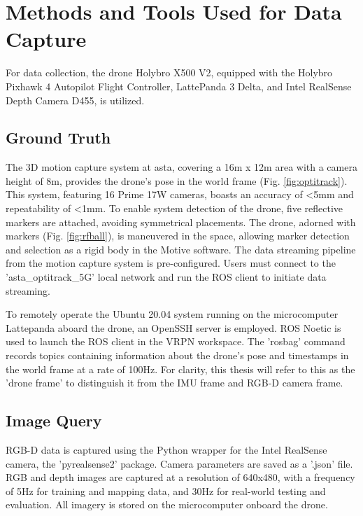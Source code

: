 \section{Methods and Tools Used for Data Capture}

For data collection, the drone Holybro X500 V2, equipped with the Holybro Pixhawk 4 Autopilot Flight Controller, LattePanda 3 Delta, and Intel RealSense Depth Camera D455, is utilized.
\newline
\subsection{Ground Truth}
The 3D motion capture system at \acrshort{asta}, covering a 16m x 12m area with a camera height of 8m, provides the drone's pose in the world frame (Fig. \ref{fig:optitrack}). This system, featuring 16 Prime 17W cameras, boasts an accuracy of <5mm and repeatability of <1mm. To enable system detection of the drone, five reflective markers are attached, avoiding symmetrical placements. The drone, adorned with markers (Fig. \ref{fig:rfball}), is maneuvered in the space, allowing marker detection and selection as a rigid body in the Motive software. The data streaming pipeline from the motion capture system is pre-configured. Users must connect to the 'asta\_optitrack\_5G' local network and run the ROS client to initiate data streaming.

To remotely operate the Ubuntu 20.04 system running on the microcomputer Lattepanda aboard the drone, an OpenSSH server is employed. ROS Noetic is used to launch the ROS client in the VRPN workspace. The 'rosbag' command records topics containing information about the drone's pose and timestamps in the world frame at a rate of 100Hz. For clarity, this thesis will refer to this as the 'drone frame' to distinguish it from the IMU frame and RGB-D camera frame.


\subsection{Image Query}

RGB-D data is captured using the Python wrapper for the Intel RealSense camera, the 'pyrealsense2' package\cite{intelrealsense_librealsense_python}. Camera parameters are saved as a '.json' file. RGB and depth images are captured at a resolution of 640x480, with a frequency of 5Hz for training and mapping data, and 30Hz for real-world testing and evaluation. All imagery is stored on the microcomputer onboard the drone.
\newline

